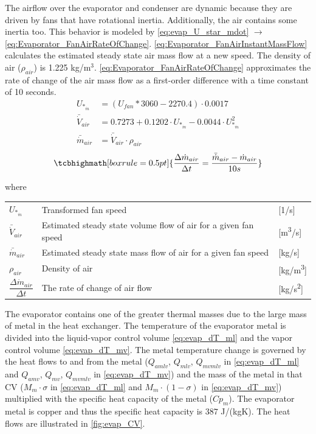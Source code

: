 The airflow over the evaporator and condenser are dynamic because they are driven by fans that have rotational inertia. Additionally, the air contains some inertia too. This behavior is modeled by \cref{eq:evap_U_star_mdot} $\rightarrow$ \cref{eq:Evaporator_FanAirRateOfChange}. \cref{eq:Evaporator_FanAirInstantMassFlow} calculates the estimated steady state air mass flow at a new speed. The density of air ($\rho_{air}$) is 1.225 \si{kg}/\si{m}$^3$. \cref{eq:Evaporator_FanAirRateOfChange} approximates the rate of change of the air mass flow as a first-order difference with a time constant of 10 seconds.
\begin{align}
	U_{*_{\dot{m}}} & = (U_{fan}*3060 - 2270.4)\cdot 0.0017 \label{eq:evap_U_star_mdot}\\
	\bar{\dot{V}}_{air} & = 0.7273 + 0.1202 \cdot 	U_{*_{\dot{m}}}  -0.0044 \cdot 	U_{*_{\dot{m}}}^2	\label{eq:evap_Vbardot_air} \\
	\bar{\dot{m}}_{air} & = \bar{\dot{V}}_{air} \cdot \rho_{air}	\label{eq:Evaporator_FanAirInstantMassFlow}
\end{align}
\begin{equation}
	\tcbhighmath[boxrule = 0.5pt]{ 	\frac{\Delta \dot{m}_{air}}{\Delta t} = \frac{\bar{\dot{m}}_{air}  - \dot{m}_{air}}{10s}  }  \label{eq:Evaporator_FanAirRateOfChange}
\end{equation}

where

\begin{center}
	\begin{tabular}{l p{10cm} l}
		$ U_{*_{\dot{m}}} $ 						& Transformed fan speed												& [1/\si{s}]\\
		$\bar{\dot{V}}_{air}$						& Estimated steady state volume flow of air for a given fan speed 	& [\si{m^3}/\si{s}] \\
		$\bar{\dot{m}}_{air}$						& Estimated steady state mass flow of air for a given fan speed 	& [\si{kg}/\si{s}] \\
		$\rho_{air}$								& Density of air													& [\si{kg}/\si{m^3}] \\[0.2cm]
		$\dfrac{\Delta \dot{m}_{air}}{\Delta t} $ 	& The rate of change of	air flow 									& [\si{kg}/\si{s^2}]
	\end{tabular}
\end{center}

The evaporator contains one of the greater thermal masses due to the large mass of metal in the heat exchanger. The temperature of the evaporator metal is divided into the liquid-vapor control volume \cref{eq:evap_dT_ml} and the vapor control volume \cref{eq:evap_dT_mv}. The metal temperature change is governed by the heat flows to and from the metal ($Q_{amlv}$, $Q_{mlv}$, $Q_{mvmlv}$ in \cref{eq:evap_dT_ml} and $Q_{amv}$, $Q_{mv}$, $Q_{mvmlv}$ in \cref{eq:evap_dT_mv}) and the mass of the metal in that CV ($M_m \cdot \sigma$ in \cref{eq:evap_dT_ml} and $M_m \cdot (1 - \sigma)$ in \cref{eq:evap_dT_mv}) multiplied with the specific heat capacity of the metal ($Cp_m$). The evaporator metal is copper and thus the specific heat capacity is $387$ \si{J}/(\si{kg}\si{K}). The heat flows are illustrated in \cref{fig:evap_CV}.



